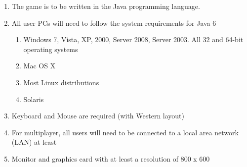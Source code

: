 \begin{enumerate}
\item The game is to be written in the Java programming language.
\item All user PCs will need to follow the system requirements for Java 6
\begin{enumerate}
\item Windows 7, Vista, XP, 2000, Server 2008, Server 2003. All 32 and 64-bit operating systems
\item Mac OS X
\item Most Linux distributions
\item Solaris
\end{enumerate}
\item Keyboard and Mouse are required (with Western layout)
\item For multiplayer, all users will need to be connected to a local area network (LAN) at least
\item Monitor and graphics card with at least a resolution of 800 x 600 
\end{enumerate}